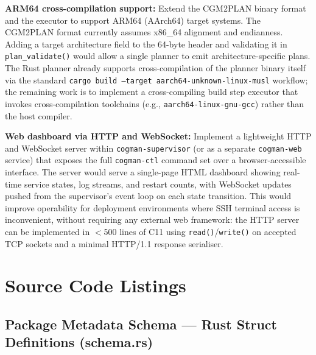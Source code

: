 \documentclass[12pt,a4paper]{report}
\begin{document}
\textbf{ARM64 cross-compilation support:}
Extend the CGM2PLAN binary format and the executor to support ARM64 (AArch64)
target systems. The CGM2PLAN format currently assumes x86\_64 alignment and
endianness. Adding a target architecture field to the 64-byte header and
validating it in \texttt{plan\_validate()} would allow a single planner to emit
architecture-specific plans. The Rust planner already supports cross-compilation
of the planner binary itself via the standard \texttt{cargo build --target
aarch64-unknown-linux-musl} workflow; the remaining work is to implement a
cross-compiling build step executor that invokes cross-compilation toolchains
(e.g., \texttt{aarch64-linux-gnu-gcc}) rather than the host compiler.

\textbf{Web dashboard via HTTP and WebSocket:}
Implement a lightweight HTTP and WebSocket server within \texttt{cogman-supervisor}
(or as a separate \texttt{cogman-web} service) that exposes the full
\texttt{cogman-ctl} command set over a browser-accessible interface. The server
would serve a single-page HTML dashboard showing real-time service states, log
streams, and restart counts, with WebSocket updates pushed from the supervisor's
event loop on each state transition. This would improve operability for deployment
environments where SSH terminal access is inconvenient, without requiring any
external web framework: the HTTP server can be implemented in $<$500 lines of C11
using \texttt{read()}/\texttt{write()} on accepted TCP sockets and a minimal HTTP/1.1
response serialiser.

\appendix

\chapter{Source Code Listings}

\section{Package Metadata Schema --- Rust Struct Definitions (schema.rs)}
\end{document}
